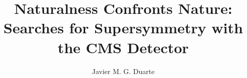 \documentclass[draftfoot,12pt]{cit_thesis}
\begin{document}
\author{Javier M. G. Duarte}
\title{Naturalness Confronts Nature: Searches for Supersymmetry with the CMS Detector}
\maketitle                  %



\tableofcontents
\mainmatter                                 









{}

\end{document}
